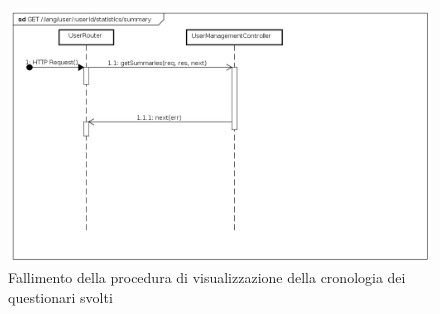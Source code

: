 \begin{itemize}
\label{Fallimento della procedura di visualizzazione della cronologia dei questionari svolti}
\begin{figure}[ht]
	\centering
	\includegraphics[scale=0.40]{UML/DiagrammiDiSequenza/Back-end/GET_LangUserUserIdStatisticsSummaryFailure.png}
	\caption{Fallimento della procedura di visualizzazione della cronologia dei questionari svolti}
\end{figure}
\FloatBarrier

\end{itemize}

